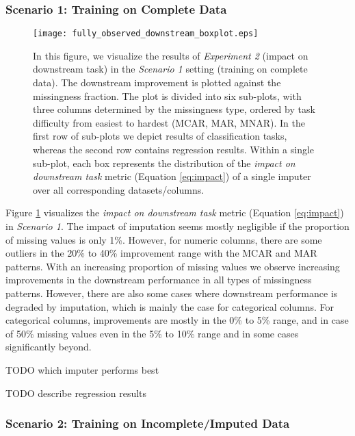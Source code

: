 \subsubsection{Scenario 1: Training on Complete Data}


\begin{figure}\centering
	\texttt{[image: fully\_observed\_downstream\_boxplot.eps]}

	\caption[Downstream Ranks - Fully Observed]{In this figure, we visualize the results of \textit{Experiment 2} (impact on downstream task) in the \textit{Scenario 1} setting (training on complete data). The downstream improvement is plotted against the missingness fraction. The plot is divided into six sub-plots, with three columns determined by the missingness type, ordered by task difficulty from easiest to hardest (MCAR, MAR, MNAR). In the first row of sub-plots we depict results of classification tasks, whereas the second row contains regression results. Within a single sub-plot, each box represents the distribution of the \textit{impact on downstream task} metric (Equation \ref{eq:impact}) of a single imputer over all corresponding datasets/columns.
    }
	\label{fig:fully_observed_downstream_boxplot}
\end{figure}

Figure \ref{fig:fully_observed_downstream_boxplot} visualizes the \textit{impact on downstream task} metric (Equation \ref{eq:impact}) in \textit{Scenario 1}. The impact of imputation seems mostly negligible if the proportion of missing values is only 1\%. However, for numeric columns, there are some outliers in the 20\% to 40\% improvement range with the MCAR and MAR patterns. With an increasing proportion of missing values we observe increasing improvements in the downstream performance in all types of missingness patterns. However, there are also some cases where downstream performance is degraded by imputation, which is mainly the case for categorical columns. For categorical columns, improvements are mostly in the 0\% to 5\% range, and in case of 50\% missing values even in the 5\% to 10\% range and in some cases significantly beyond.

TODO which imputer performs best

TODO describe regression results


\subsubsection{Scenario 2: Training on Incomplete/Imputed Data}



